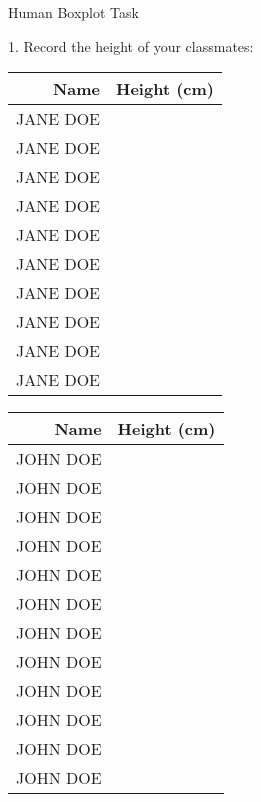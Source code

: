 \documentclass{article}
\begin{document}
 
\begin{center}
{\Huge Human Boxplot Task}
\end{center}

\vspace{1cm}

{\huge 1. Record the height of your classmates:}

\vspace{1cm}

\begin{center}
{\large
\begin{tabular}{r|c}
\textbf{Name} & \textbf{Height (cm)} \\ \hline
JANE DOE & \\ \hline
JANE DOE & \\ \hline
JANE DOE & \\ \hline
JANE DOE & \\ \hline
JANE DOE & \\ \hline
JANE DOE & \\ \hline
JANE DOE & \\ \hline
JANE DOE & \\ \hline
JANE DOE & \\ \hline
JANE DOE & \\
\end{tabular}
}
\end{center}

\vspace{1cm}

\begin{center}
{\large
\begin{tabular}{r|c}
\textbf{Name} & \textbf{Height (cm)} \\ \hline
JOHN DOE & \\ \hline
JOHN DOE & \\ \hline
JOHN DOE & \\ \hline
JOHN DOE & \\ \hline
JOHN DOE & \\ \hline
JOHN DOE & \\ \hline
JOHN DOE & \\ \hline
JOHN DOE & \\ \hline
JOHN DOE & \\ \hline
JOHN DOE & \\ \hline
JOHN DOE & \\ \hline
JOHN DOE & \\
\end{tabular}
}
\end{center}
\end{document}
